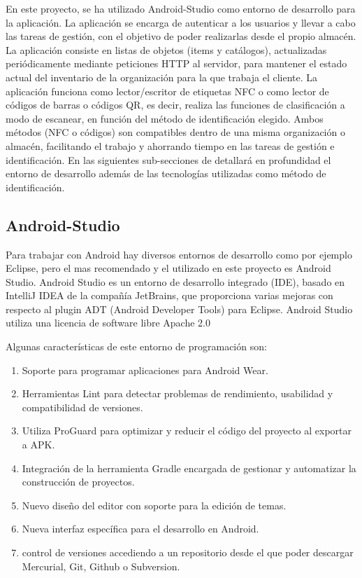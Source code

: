 \documentclass[a4paper,11pt]{book}
\begin{document}
En este proyecto, se ha utilizado Android-Studio como entorno de desarrollo para la aplicación. La aplicación se encarga de autenticar a los usuarios y llevar a cabo las tareas de gestión, con el objetivo de poder realizarlas desde el propio almacén. La aplicación consiste en listas de  objetos (items y catálogos), actualizadas periódicamente mediante peticiones HTTP al servidor, para mantener el estado actual del inventario de la organización para la que trabaja el cliente. La aplicación funciona como lector/escritor de etiquetas NFC o como lector de códigos de barras o códigos QR, es decir, realiza las funciones de clasificación a modo de escanear, en función del método de identificación elegido. Ambos métodos (NFC o códigos) son compatibles dentro de una misma organización o almacén, facilitando el trabajo y ahorrando tiempo en las tareas de gestión e identificación. En las siguientes sub-secciones de detallará en profundidad el entorno de desarrollo además de las tecnologías utilizadas como método de identificación. 
 
  

\subsection{Android-Studio}

Para trabajar con Android hay diversos entornos de desarrollo como por ejemplo Eclipse, pero el mas recomendado y el utilizado en este proyecto es Android Studio\cite{as}. Android Studio es un entorno de desarrollo integrado (IDE), basado en IntelliJ IDEA de la compañía JetBrains,  que proporciona varias mejoras con respecto al plugin ADT (Android Developer Tools) para Eclipse. Android Studio utiliza una licencia de software libre Apache 2.0




Algunas características\cite{as2} de este entorno de programación son:

\begin{enumerate}
\item Soporte para programar aplicaciones para Android Wear.
\item Herramientas Lint para detectar problemas de rendimiento, usabilidad y compatibilidad de versiones.
\item Utiliza ProGuard para optimizar y reducir el código del proyecto al exportar a APK.\item Integración de la herramienta Gradle encargada de gestionar y automatizar la construcción de proyectos.
\item Nuevo diseño del editor con soporte para la edición de temas. 
\item Nueva interfaz específica para el desarrollo en Android.
\item control de versiones accediendo a un repositorio desde el que poder descargar Mercurial, Git, Github o Subversion. 
\end{enumerate}
\end{document}
